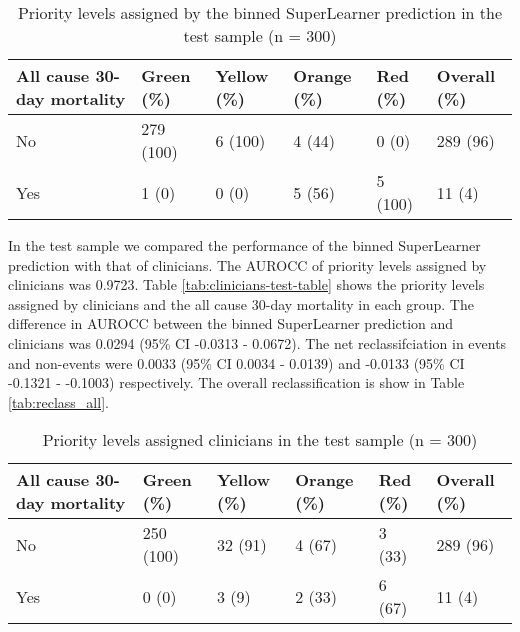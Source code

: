 \documentclass[10pt,letterpaper]{article}\usepackage[]{graphicx}\usepackage[]{color}
\begin{document}
\begin{table}[ht]
\centering
\caption{Priority levels assigned by the binned SuperLearner prediction in the test sample (n = 300)} 
\label{tab:superlearner-priorities-test}
\begin{tabular}{llllll}
  \hline
All cause 30-day mortality & Green (\%) & Yellow (\%) & Orange (\%) & Red (\%) & Overall (\%) \\ 
  \hline
No & 279 (100) & 6 (100) & 4 (44) & 0 (0) & 289 (96) \\ 
  Yes & 1 (0) & 0 (0) & 5 (56) & 5 (100) & 11 (4) \\ 
   \hline
\end{tabular}
\end{table}


In the test sample we compared the performance of the binned SuperLearner
prediction with that of clinicians. The AUROCC of priority levels assigned by
clinicians was 0.9723. Table \ref{tab:clinicians-test-table}
shows the priority levels assigned by clinicians and the all cause 30-day
mortality in each group. The difference in AUROCC between the binned
SuperLearner prediction and clinicians was
0.0294 (95\% CI -0.0313 - 0.0672). The net reclassifciation in events and
non-events were 0.0033 (95\% CI 0.0034 - 0.0139) and -0.0133 (95\% CI -0.1321 - -0.1003) respectively. The overall
reclassification is show in Table \ref{tab:reclass_all}.

\begin{table}[ht]
\centering
\caption{Priority levels assigned clinicians in the test sample (n = 300)} 
\label{tab:clinicians-priorities-test}
\begin{tabular}{llllll}
  \hline
All cause 30-day mortality & Green (\%) & Yellow (\%) & Orange (\%) & Red (\%) & Overall (\%) \\ 
  \hline
No & 250 (100) & 32 (91) & 4 (67) & 3 (33) & 289 (96) \\ 
  Yes & 0 (0) & 3 (9) & 2 (33) & 6 (67) & 11 (4) \\ 
   \hline
\end{tabular}
\end{table}
\end{document}
